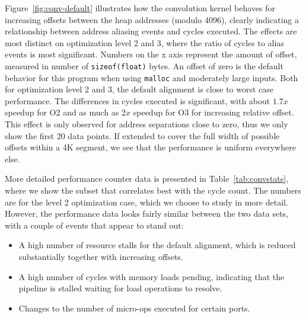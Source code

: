 \documentclass[10pt, conference, compsocconf]{IEEEtran}
\begin{document}
Figure~\ref{fig:conv-default} illustrates how the convolution kernel behaves for increasing offsets between the heap addresses (modulo 4096), clearly indicating a relationship between address aliasing events and cycles executed.
The effects are most distinct on optimization level 2 and 3, where the ratio of cycles to alias events is most significant.
Numbers on the x axis represent the amount of offset, measured in number of \texttt{sizeof(float)} bytes.
An offset of zero is the default behavior for this program when using \texttt{malloc} and moderately large inputs.
Both for optimization level 2 and 3, the default alignment is close to worst case performance.
The differences in cycles executed is significant, with about $1.7x$ speedup for O2 and as much as $2x$ speedup for O3 for increasing relative offset.
This effect is only observed for address separations close to zero, thus we only show the first 20 data points.
If extended to cover the full width of possible offsets within a 4K segment, we see that the performance is uniform everywhere else.

More detailed performance counter data is presented in Table~\ref{tab:convstats}, where we show the subset that correlates best with the cycle count.
The numbers are for the level 2 optimization case, which we choose to study in more detail.
However, the performance data looks fairly similar between the two data sets, with a couple of events that appear to stand out:
\begin{itemize}
    \item A high number of resource stalls for the default alignment, which is reduced substantially together with increasing offsets. 
    \item A high number of cycles with memory loads pending, indicating that the pipeline is stalled waiting for load operations to resolve.
    \item Changes to the number of micro-ops executed for certain ports.
\end{itemize}
\end{document}
